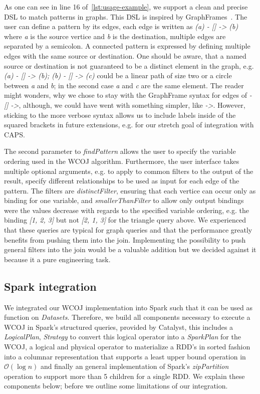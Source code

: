 As one can see in line 16 %
of~\cref{lst:usage-example}, we support a clean and precise DSL to match patterns in graphs.
This DSL is inspired by GraphFrames~\cite{graph-frames}.
The user can define a pattern by its edges, each edge is written as \textit{(a) - [] -> (b)} where \textit{a} is the
source vertice and \textit{b} is the destination, multiple edges are separated by a semicolon.
A connected pattern is expressed by defining multiple edges with the same source or destination.
One should be aware, that a named source or destination is not guaranteed to be a distinct element in the graph,
e.g. \textit{(a) - [] -> (b); (b) - [] -> (c)} could be a linear path of size two or a circle between \textit{a} and
\textit{b}; in the second case \textit{a} and \textit{c} are the same element.
The reader might wonders, why we chose to stay with the GraphFrame syntax for edges of
\textit{- [] ->}, although, we could have went with something simpler, like \textit{->}.
However, sticking to the more verbose syntax allows us to include labels inside of the squared brackets
in future extensions, e.g. for our stretch goal of integration with CAPS.

The second parameter to \textit{findPattern} allows the user to specify the variable ordering used in the WCOJ algorithm.
Furthermore, the user interface takes multiple optional arguments, e.g. to apply to common filters to the output of the result,
specify different relationships to be used as input for each edge of the pattern.
The filters are \textit{distinctFilter}, ensuring that each vertice can occur only as binding for one variable, and
\textit{smallerThanFilter} to allow only output bindings were the values decrease with regards to the specified variable ordering,
e.g. the binding \textit{[1, 2, 3]} but not \textit{[2, 1, 3]} for the triangle query above.
We experienced that these queries are typical for graph queries and that the performance greatly benefits from pushing
them into the join.
Implementing the possibility to push general filters into the join would be a valuable addition but we decided against it because
it a pure engineering task.


\subsection{Spark integration}\label{subsec:spark-integration}
We integrated our WCOJ implementation into Spark such that it can be used as function on \textit{Datasets}.
Therefore, we build all components necessary to execute a WCOJ in Spark's structured queries, provided by Catalyst, this includes a
\textit{LogicalPlan},
\textit{Strategy} to convert this logical operator into a \textit{SparkPlan} for the WCOJ, a logical and physical operator to materialize
a RDD's in sorted fashion into a columnar representation that supports a least upper bound operation in $\mathcal{O} (\log n)$ and
finally an general implementation of Spark's \textit{zipPartition} operation to support more than 5 children for a single RDD.
We explain these components below; before we outline some limitations of our integration.

